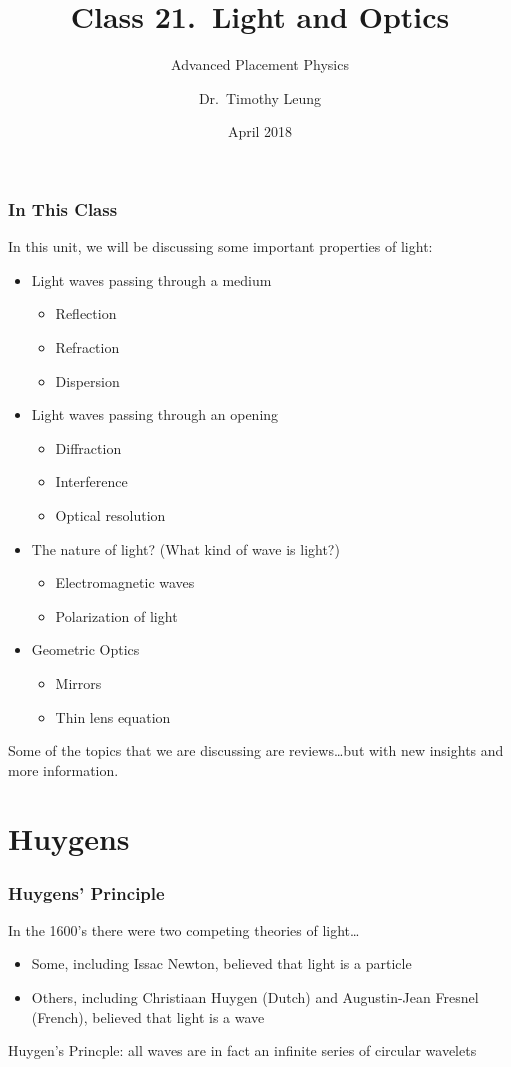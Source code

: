 \documentclass[compress,aspectratio=169]{beamer}
\title{Class 21.\ Light and Optics}
\subtitle{Advanced Placement Physics}
\author[TML]{Dr.\ Timothy Leung}
\institute{Olympiads School}
\date{April 2018}
\begin{document}
\begin{frame}
  \maketitle
\end{frame}

\begin{frame}
  \frametitle{In This Class}
  In this unit, we will be discussing some important properties of light:
  \begin{itemize}
  \item Light waves passing through a medium
    \begin{itemize}
    \item Reflection
    \item Refraction
    \item Dispersion
    \end{itemize}
  \item Light waves passing through an opening
    \begin{itemize}
    \item Diffraction
    \item Interference
    \item Optical resolution
    \end{itemize}
  \item The nature of light? (What kind of wave is light?)
    \begin{itemize}
    \item Electromagnetic waves
    \item Polarization of light
    \end{itemize}
  \item Geometric Optics
    \begin{itemize}
    \item Mirrors
    \item Thin lens equation
    \end{itemize}
  \end{itemize}
  Some of the topics that we are discussing are reviews\ldots but with new
  insights and more information.
\end{frame}

\section{Huygens}
\begin{frame}
  \frametitle{Huygens' Principle}
  In the 1600's there were two competing theories of light\ldots
  \begin{itemize}
  \item Some, including Issac Newton, believed that  light is a particle
  \item Others, including Christiaan Huygen (Dutch) and Augustin-Jean Fresnel
    (French), believed that light is a wave
  \end{itemize}
  \vspace{0.4in}

  Huygen's Princple: all waves are in fact an infinite series of circular
  wavelets
\end{frame}
\end{document}

